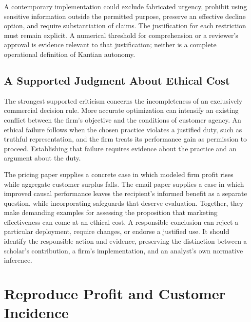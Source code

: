 A contemporary implementation could exclude fabricated urgency, prohibit
using sensitive information outside the permitted purpose, preserve an
effective decline option, and require substantiation of claims. The
justification for each restriction must remain explicit. A numerical
threshold for comprehension or a reviewer's approval is evidence
relevant to that justification; neither is a complete operational
definition of Kantian autonomy.

\hypertarget{M09-a-supported-judgment-about-ethical-cost}{%
\subsection{A Supported Judgment About Ethical
Cost}\label{M09-a-supported-judgment-about-ethical-cost}}

\noindent The strongest supported criticism concerns the incompleteness of an
exclusively commercial decision rule. More accurate optimization can
intensify an existing conflict between the firm's objective and the
conditions of customer agency. An ethical failure follows when the
chosen practice violates a justified duty, such as truthful
representation, and the firm treats its performance gain as permission
to proceed. Establishing that failure requires evidence about the
practice and an argument about the duty.

The pricing paper supplies a concrete case in which modeled firm profit
rises while aggregate customer surplus falls. The email paper supplies a
case in which improved causal performance leaves the recipient's
informed benefit as a separate question, while incorporating safeguards
that deserve evaluation. Together, they make demanding examples for
assessing the proposition that marketing effectiveness can come at an
ethical cost. A responsible conclusion can reject a particular
deployment, require changes, or endorse a justified use. It should
identify the responsible action and evidence, preserving the distinction
between a scholar's contribution, a firm's implementation, and an
analyst's own normative inference.



\hypertarget{M09-reproduce-profit-and-customer-incidence}{%
\section{Reproduce Profit and Customer
Incidence}\label{M09-reproduce-profit-and-customer-incidence}}

